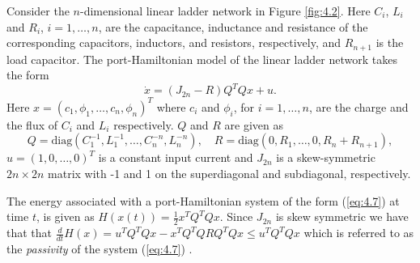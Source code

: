 Consider the $n$-dimensional linear ladder network in Figure \ref{fig:4.2}. Here $C_i$, $L_i$ and $R_i$, $i=1,\dots,n$, are the capacitance, inductance and resistance of the corresponding capacitors, inductors, and resistors, respectively, and $R_{n+1}$ is the load capacitor. The port-Hamiltonian model of the linear ladder network takes the form
\begin{equation} \label{eq:4.7}
		\dot x = (J_{2n} - R)Q^TQx + u.
\end{equation}
Here $x = (c_1,\phi_1,\dots,c_n,\phi_n)^T$ where $c_i$ and $\phi_i$, for $i=1,\dots,n$, are the charge and the flux of $C_i$ and $L_i$ respectively. $Q$ and $R$ are given as
\begin{equation}
	Q = \text{diag}(C_1^{-1},L_1^{-1},\dots,C_n^{-n},L_n^{-n}), \quad R = \text{diag}(0,R_1,\dots,0,R_n+R_{n+1}),
\end{equation}
$u=(1,0,\dots,0)^T$ is a constant input current and $J_{2n}$ is a skew-symmetric $2n\times 2n$ matrix with -1 and 1 on the superdiagonal and subdiagonal, respectively. 

The energy associated with a port-Hamiltonian system of the form (\ref{eq:4.7}) at time $t$, is given as $H(x(t)) = \frac 1 2 x^T Q^T Q x$. Since $J_{2n}$ is skew symmetric we have that that $\frac d {dt} H(x) = u^T Q^T Q x - x^T Q^T Q R Q^T Q x \leq u^T Q^T Q x$ which is referred to as the \emph{passivity} of the system (\ref{eq:4.7}) \cite{vanderSchaft:1996es,Willems:1972ek}.

